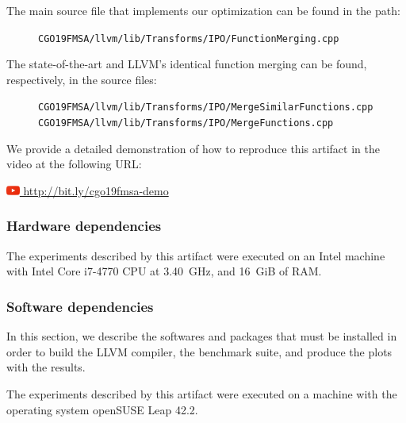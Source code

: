 {\begin{itemize}
\end{itemize}

The main source file that implements our optimization can be found in the path:
\begin{figure}[h]
\small \texttt{CGO19FMSA/llvm/lib/Transforms/IPO/FunctionMerging.cpp}
\end{figure}

The state-of-the-art and LLVM's identical function merging can be found,
respectively, in the source files:
\begin{figure}[h]
\small \texttt{CGO19FMSA/llvm/lib/Transforms/IPO/MergeSimilarFunctions.cpp}
\small \texttt{CGO19FMSA/llvm/lib/Transforms/IPO/MergeFunctions.cpp}
\end{figure}

We provide a detailed demonstration of how to reproduce this artifact in the video at the following URL:

\href{http://bit.ly/cgo19fmsa-video}{\includegraphics[width=1.2em]{figs/artifact/youtube.png} http://bit.ly/cgo19fmsa-demo}


\subsubsection{Hardware dependencies}


The experiments described by this artifact were executed on an Intel machine
with Intel Core i7-4770 CPU at 3.40~GHz, and 16~GiB of RAM.


\subsubsection{Software dependencies}

In this section, we describe the softwares and packages that must be installed 
in order to build the LLVM compiler, the benchmark suite, and produce the plots with the results.

The experiments described by this artifact were executed on a machine
with the operating system openSUSE Leap 42.2.

}
